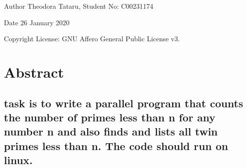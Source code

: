 \begin{DoxyAuthor}{Author}
Theodora Tataru, Student No\+: C00231174~\newline
 
\end{DoxyAuthor}
\begin{DoxyDate}{Date}
26 January 2020 
\end{DoxyDate}
\begin{DoxyCopyright}{Copyright}
License\+: G\+NU Affero General Public License v3. 
\end{DoxyCopyright}
\hypertarget{index_Abstract}{}\section{Abstract}\label{index_Abstract}
\hypertarget{index_The}{}\subsection{task is to write a parallel program that counts the number of primes less than n for any number n and also finds and lists all twin primes less than n. The code should run on linux.}\label{index_The}
